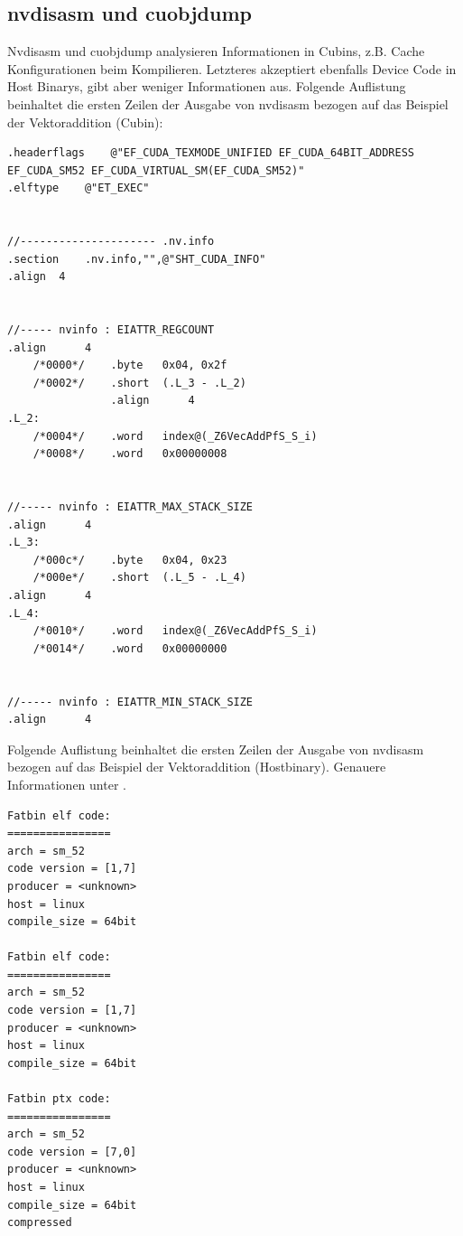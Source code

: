 			\subsection{nvdisasm und cuobjdump}
			Nvdisasm und cuobjdump analysieren Informationen in Cubins, z.B. Cache Konfigurationen beim Kompilieren. Letzteres akzeptiert ebenfalls Device Code in Host Binarys, gibt aber weniger Informationen aus. Folgende Auflistung beinhaltet die ersten Zeilen der Ausgabe von nvdisasm bezogen auf das Beispiel der Vektoraddition (Cubin): 
			
			\begin{lstlisting}[caption=nvdisasm Output] 
.headerflags	@"EF_CUDA_TEXMODE_UNIFIED EF_CUDA_64BIT_ADDRESS EF_CUDA_SM52 EF_CUDA_VIRTUAL_SM(EF_CUDA_SM52)"
.elftype	@"ET_EXEC"


//--------------------- .nv.info
.section	.nv.info,"",@"SHT_CUDA_INFO"
.align	4


//----- nvinfo : EIATTR_REGCOUNT
.align		4
    /*0000*/ 	.byte	0x04, 0x2f
    /*0002*/ 	.short	(.L_3 - .L_2)
	            .align		4
.L_2:
    /*0004*/ 	.word	index@(_Z6VecAddPfS_S_i)
    /*0008*/ 	.word	0x00000008


//----- nvinfo : EIATTR_MAX_STACK_SIZE
.align		4
.L_3:
    /*000c*/ 	.byte	0x04, 0x23
    /*000e*/ 	.short	(.L_5 - .L_4)
.align		4
.L_4:
    /*0010*/ 	.word	index@(_Z6VecAddPfS_S_i)
    /*0014*/ 	.word	0x00000000


//----- nvinfo : EIATTR_MIN_STACK_SIZE
.align		4
	    \end{lstlisting}
	    
	    Folgende Auflistung beinhaltet die ersten Zeilen der Ausgabe von nvdisasm bezogen auf das Beispiel der Vektoraddition (Hostbinary). Genauere Informationen unter \autocite{cudaBU}.
		
	    \begin{lstlisting}[caption=cuobjdump Output] 
Fatbin elf code:
================
arch = sm_52
code version = [1,7]
producer = <unknown>
host = linux
compile_size = 64bit

Fatbin elf code:
================
arch = sm_52
code version = [1,7]
producer = <unknown>
host = linux
compile_size = 64bit

Fatbin ptx code:
================
arch = sm_52
code version = [7,0]
producer = <unknown>
host = linux
compile_size = 64bit
compressed
        \end{lstlisting}
